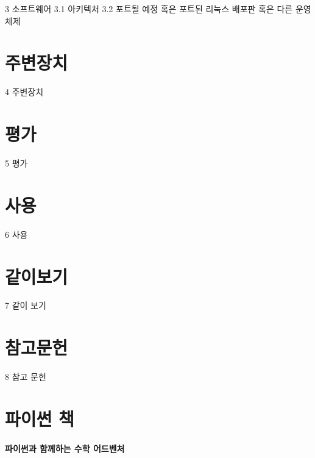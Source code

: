 \documentclass[12pt, a4paper, oneside]{book}
\let\stdsection\section
\renewcommand\section{\newpage\stdsection}
\begin{document}
3	소프트웨어
3.1	아키텍처
3.2	포트될 예정 혹은 포트된 리눅스 배포판 혹은 다른 운영 체제

	\section{ 주변장치}

4	주변장치


	\section{ 평가}

5	평가

	\section{ 사용}

6	사용


	\section{ 같이보기}

7	같이 보기

	\section{ 참고문헌}
8	참고 문헌

%
	\section{파이썬 책 }


\paragraph{파이썬과 함께하는 수학 어드벤처 }
\end{document}

